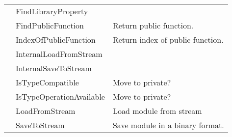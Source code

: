 \begin{tabularx}{\textwidth}{llX}
\pageref{thoriumcorepkg:thorium:tthoriummodule:findlibraryproperty} & FindLibraryProperty  &  \\
\pageref{thoriumcorepkg:thorium:tthoriummodule:findpublicfunction} & FindPublicFunction  & Return public function. \\
\pageref{thoriumcorepkg:thorium:tthoriummodule:indexofpublicfunction} & IndexOfPublicFunction  & Return index of public function. \\
\pageref{thoriumcorepkg:thorium:tthoriummodule:internalloadfromstream} & InternalLoadFromStream  &  \\
\pageref{thoriumcorepkg:thorium:tthoriummodule:internalsavetostream} & InternalSaveToStream  &  \\
\pageref{thoriumcorepkg:thorium:tthoriummodule:istypecompatible} & IsTypeCompatible  & Move to private? \\
\pageref{thoriumcorepkg:thorium:tthoriummodule:istypeoperationavailable} & IsTypeOperationAvailable  & Move to private? \\
\pageref{thoriumcorepkg:thorium:tthoriummodule:loadfromstream} & LoadFromStream  & Load module from stream \\
\pageref{thoriumcorepkg:thorium:tthoriummodule:savetostream} & SaveToStream  & Save module in a binary format. \\
\hline
\end{tabularx}
